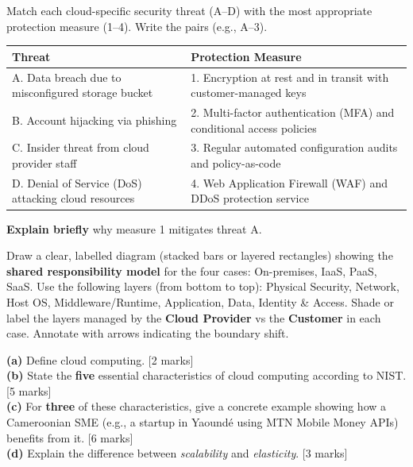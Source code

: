 \documentclass[11pt]{article}
\newcounter{popsec}
\newcounter{popsub}
\newcommand{\courssub}[1]{%
  \stepcounter{popsub}%
  \par\vspace{9pt}\noindent{\popxbold\fontsize{11.5}{13}\selectfont\color{popink}{\color{poporange}\thepopsec.\thepopsub}\hspace{6pt}#1}\par\nopagebreak\vspace{4pt}
}
\begin{document}
\begin{exercice}
Match each cloud-specific security threat (A–D) with the most appropriate protection measure (1–4). Write the pairs (e.g., A–3).

\begin{center}
\begin{tabularx}{\linewidth}{|l|X|}\hline
\textbf{Threat} & \textbf{Protection Measure} \\ \hline
A. Data breach due to misconfigured storage bucket & 1. Encryption at rest and in transit with customer-managed keys \\ \hline
B. Account hijacking via phishing & 2. Multi-factor authentication (MFA) and conditional access policies \\ \hline
C. Insider threat from cloud provider staff & 3. Regular automated configuration audits and policy-as-code \\ \hline
D. Denial of Service (DoS) attacking cloud resources & 4. Web Application Firewall (WAF) and DDoS protection service \\ \hline
\end{tabularx}
\end{center}

\textbf{Explain briefly} why measure 1 mitigates threat A.
\end{exercice}

\begin{exercice}
Draw a clear, labelled diagram (stacked bars or layered rectangles) showing the \textbf{shared responsibility model} for the four cases: On-premises, IaaS, PaaS, SaaS. Use the following layers (from bottom to top): Physical Security, Network, Host OS, Middleware/Runtime, Application, Data, Identity \& Access. Shade or label the layers managed by the \textbf{Cloud Provider} vs the \textbf{Customer} in each case. Annotate with arrows indicating the boundary shift.
\end{exercice}

\courssub{I prepare for the GCE}

\begin{exercice}
\textbf{(a)} Define cloud computing. \hfill [2 marks]\\
\textbf{(b)} State the \textbf{five} essential characteristics of cloud computing according to NIST. \hfill [5 marks]\\
\textbf{(c)} For \textbf{three} of these characteristics, give a concrete example showing how a Cameroonian SME (e.g., a startup in Yaoundé using MTN Mobile Money APIs) benefits from it. \hfill [6 marks]\\
\textbf{(d)} Explain the difference between \emph{scalability} and \emph{elasticity}. \hfill [3 marks]
\end{exercice}
\end{document}
